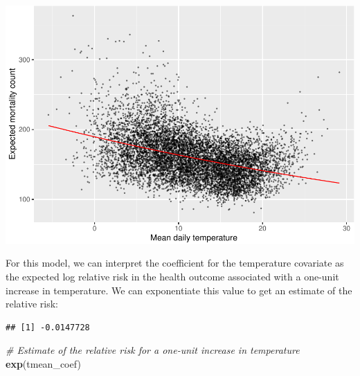 \documentclass[
]{book}
\newenvironment{Shaded}{\begin{snugshade}}{\end{snugshade}}
\newcommand{\CommentTok}[1]{\textcolor[rgb]{0.56,0.35,0.01}{\textit{#1}}}
\newcommand{\KeywordTok}[1]{\textcolor[rgb]{0.13,0.29,0.53}{\textbf{#1}}}
\newcommand{\NormalTok}[1]{#1}
\newcommand{\OperatorTok}[1]{\textcolor[rgb]{0.81,0.36,0.00}{\textbf{#1}}}
\newcommand{\StringTok}[1]{\textcolor[rgb]{0.31,0.60,0.02}{#1}}
\begin{document}
\includegraphics{adv_epi_analysis_files/figure-latex/unnamed-chunk-33-1.pdf}

For this model, we can interpret the coefficient for the temperature covariate
as the expected log relative risk in the health outcome associated with a
one-unit increase in temperature. We can exponentiate this value to get an
estimate of the relative risk:

\begin{Shaded}
\end{Shaded}

\begin{verbatim}
## [1] -0.0147728
\end{verbatim}

\begin{Shaded}
\begin{Highlighting}[]
\CommentTok{# Estimate of the relative risk for a one-unit increase in temperature}
\KeywordTok{exp}\NormalTok{(tmean_coef)}
\end{Highlighting}
\end{Shaded}
\end{document}
